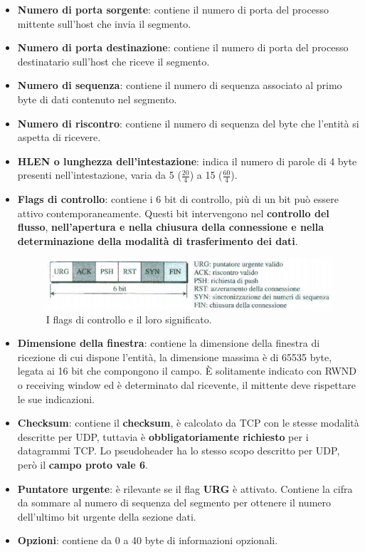\documentclass[11pt,a4paper,oneside]{book}
\theoremstyle{definition}
\begin{document}
\begin{itemize}
	\item \textbf{Numero di porta sorgente}: contiene il numero di porta del processo mittente sull'host che invia il segmento.
	\item \textbf{Numero di porta destinazione}: contiene il numero di porta del processo destinatario sull'host che riceve il segmento.
	\item \textbf{Numero di sequenza}: contiene il numero di sequenza associato al primo byte di dati contenuto nel segmento.
	\item \textbf{Numero di riscontro}: contiene il numero di sequenza del byte che l'entità si aspetta di ricevere.
	\item \textbf{HLEN o lunghezza dell'intestazione}: indica il numero di parole di 4 byte presenti nell'intestazione, varia da 5 ($\frac{20}{4}$) a 15 ($\frac{60}{4}$).
	\item \textbf{Flags di controllo}: contiene i 6 bit di controllo, più di un bit può essere attivo contemporaneamente. Questi bit intervengono nel \textbf{controllo del flusso}, \textbf{nell'apertura e nella chiusura della connessione e nella determinazione della modalità di trasferimento dei dati}.
	      \begin{figure}[!h]
		      \includegraphics[scale=0.5]{Immagini/TCP_flags.png}
		      \centering
		      \caption{I flags di controllo e il loro significato.}
	      \end{figure}
	\item \textbf{Dimensione della finestra}: contiene la dimensione della finestra di ricezione di cui dispone l'entità, la dimensione massima è di 65535 byte, legata ai 16 bit che compongono il campo. È solitamente indicato con RWND o receiving window ed è determinato dal ricevente, il mittente deve rispettare le sue indicazioni.
	\item \textbf{Checksum}: contiene il \textbf{checksum}, è calcolato da TCP con le stesse modalità descritte per UDP, tuttavia è \textbf{obbligatoriamente richiesto} per i datagrammi TCP. Lo pseudoheader ha lo stesso scopo descritto per UDP, però il \textbf{campo proto vale 6}.
	\item \textbf{Puntatore urgente}: è rilevante se il flag \textbf{URG} è attivato. Contiene la cifra da sommare al numero di sequenza del segmento per ottenere il numero dell'ultimo bit urgente della sezione dati.
	\item \textbf{Opzioni}: contiene da 0 a 40 byte di informazioni opzionali.
\end{itemize}
\end{document}

